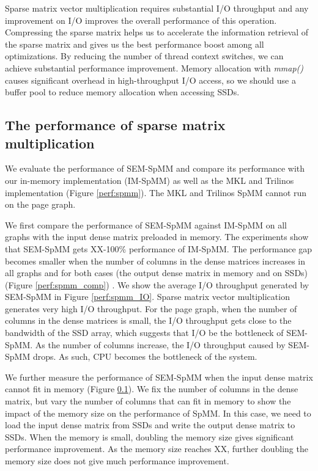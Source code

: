 Sparse matrix vector multiplication requires substantial I/O throughput and
any improvement on I/O improves the overall performance of this operation.
Compressing the sparse matrix helps us to accelerate the information retrieval
of the sparse matrix and gives us the best performance boost among all
optimizations. By reducing the number of thread context switches, we can
achieve substantial performance improvement. Memory allocation with
\textit{mmap()} causes significant overhead in high-throughput I/O access,
so we should use a buffer pool to reduce memory allocation when accessing SSDs.

\subsection{The performance of sparse matrix multiplication}

We evaluate the performance of SEM-SpMM and compare its performance with
our in-memory implementation (IM-SpMM) as well as the MKL and Trilinos
implementation (Figure \ref{perf:spmm}). The MKL and Trilinos SpMM cannot run
on the page graph.

We first compare the performance of SEM-SpMM against IM-SpMM on all graphs with
the input dense matrix preloaded in memory. The experiments show that
SEM-SpMM gets XX-100\% performance of IM-SpMM. The performance gap becomes
smaller when the number of columns in the dense matrices increases in all graphs
and for both cases (the output dense matrix in memory and on SSDs) (Figure
\ref{perf:spmm_comp}) .
We show the average I/O throughput generated by SEM-SpMM in
Figure \ref{perf:spmm_IO}. Sparse matrix vector multiplication generates very high I/O
throughput. For the page graph, when the number of columns in the dense matrices
is small, the I/O throughput gets close to the bandwidth of the SSD array, which
suggests that I/O be the bottleneck of SEM-SpMM. As the number of columns increase,
the I/O throughput
caused by SEM-SpMM drops. As such, CPU becomes the bottleneck of the system.

We further measure the performance of SEM-SpMM when the input dense matrix
cannot fit in memory (Figure \ref{}). We fix the number of columns in the dense
matrix, but vary the number of columns that can fit in memory to show
the impact of the memory size on the performance of SpMM. In this case, we need
to load the input dense matrix from SSDs and write the output dense matrix to
SSDs. When the memory
is small, doubling the memory size gives significant performance improvement.
As the memory size reaches XX, further doubling the memory size does not
give much performance improvement. 

